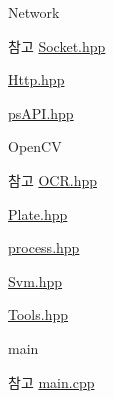 \begin{DoxyItemize}
\item Network \begin{DoxySeeAlso}{참고}
\hyperlink{_socket_8hpp_source}{Socket.\+hpp} 

\hyperlink{_http_8hpp_source}{Http.\+hpp} 

\hyperlink{ps_a_p_i_8hpp_source}{ps\+A\+P\+I.\+hpp}
\end{DoxySeeAlso}

\item Open\+CV \begin{DoxySeeAlso}{참고}
\hyperlink{_o_c_r_8hpp_source}{O\+C\+R.\+hpp} 

\hyperlink{_plate_8hpp_source}{Plate.\+hpp} 

\hyperlink{process_8hpp_source}{process.\+hpp} 

\hyperlink{_svm_8hpp_source}{Svm.\+hpp} 

\hyperlink{_tools_8hpp_source}{Tools.\+hpp}
\end{DoxySeeAlso}

\item main \begin{DoxySeeAlso}{참고}
\hyperlink{main_8cpp_source}{main.\+cpp} 
\end{DoxySeeAlso}

\end{DoxyItemize}